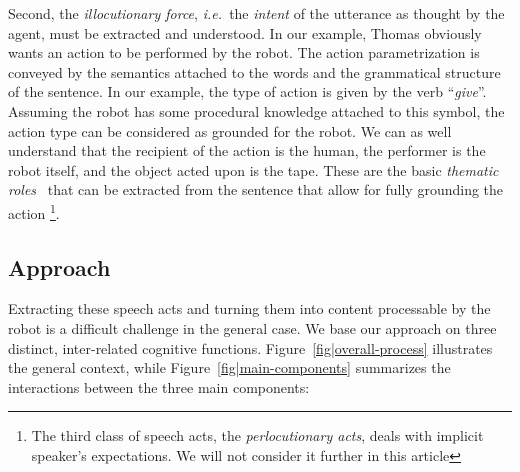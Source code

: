 \documentclass[twocolumn]{svjour3}
\newcommand{\ie}{{\textit{i.e.~}}}
\begin{document}
Second, the \emph{illocutionary force}, \ie the \emph{intent} of the utterance
as thought by the agent, must be extracted and understood. In our example,
Thomas obviously wants an action to be performed by the robot. The action
parametrization is conveyed by the semantics attached to the words and the
grammatical structure of the sentence. In our example, the type of action is
given by the verb ``\textit{give}''. Assuming the robot has some procedural
knowledge attached to this symbol, the action type can be considered as
grounded for the robot. We can as well understand that the recipient of the
action is the human, the performer is the robot itself, and the object acted
upon is the tape. These are the basic \emph{thematic roles}~\cite{Gruber1965}
that can be extracted from the sentence that allow for fully grounding the action
\footnote{The third class of speech acts, the \emph{perlocutionary acts}, deals
with implicit speaker's expectations. We will not consider it further in this
article}.


\subsection{Approach}

Extracting these speech acts and turning them into content processable by the
robot is a difficult challenge in the general case. We base our approach on
three distinct, inter-related cognitive functions.
Figure~\ref{fig|overall-process} illustrates the general context, while
Figure~\ref{fig|main-components} summarizes the interactions between the three
main components:
\end{document}
